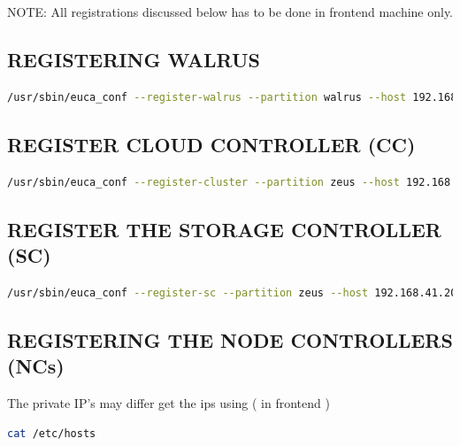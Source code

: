 NOTE: All registrations discussed below has to be done in frontend machine only.\\ \linebreak

\subsection{REGISTERING WALRUS}
\begin{lstlisting}[language=bash]
/usr/sbin/euca_conf --register-walrus --partition walrus --host 192.168.41.203 --component zeus-walrus 
\end{lstlisting}
\subsection{REGISTER CLOUD CONTROLLER (CC)}
\begin{lstlisting}[language=bash]
/usr/sbin/euca_conf --register-cluster --partition zeus --host 192.168.41.203 --component zeus-cc
\end{lstlisting}
\subsection{REGISTER THE STORAGE CONTROLLER (SC)}
\begin{lstlisting}[language=bash]
/usr/sbin/euca_conf --register-sc --partition zeus --host 192.168.41.203 --component zeus-sc
\end{lstlisting}

\subsection{REGISTERING THE NODE CONTROLLERS (NCs)}
The private IP’s may differ get the ips using ( in frontend )
\begin{lstlisting}[language=bash]
cat /etc/hosts
\end{lstlisting}

